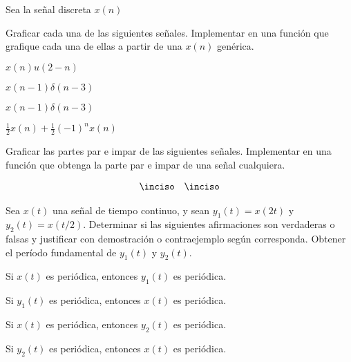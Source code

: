 \begin{ejercicio}
Sea la señal discreta $x(n)$
\begin{center}
    
\end{center}

Graficar cada una de las siguientes señales. Implementar en \Keyboardsym una función que grafique cada una de ellas a partir de una $x(n)$ genérica.

\inciso $x(n) u(2-n)$

\inciso $x(n-1) \delta(n-3)$

\inciso $x(n-1) \delta(n-3)$

\inciso $\frac{1}{2}x(n) + \frac{1}{2}(-1)^n x(n)$

\end{ejercicio}

\begin{ejercicio}
Graficar las partes par e impar de las siguientes señales. Implementar en \Keyboardsym una función que obtenga la parte par e impar de una señal cualquiera. 

\begin{align*}
\inciso \parbox{.3\textwidth}{} & \hfill & \inciso \parbox{.3\textwidth}{}
\end{align*}
\end{ejercicio}

\begin{ejercicio}
Sea $x(t)$ una señal de tiempo continuo, y sean $y_1(t) = x(2 t)$ y $y_2(t) = x(t / 2)$. Determinar si las siguientes afirmaciones son verdaderas o falsas y justificar con demostración o contraejemplo según corresponda. Obtener el período fundamental de $y_1(t)$ y $y_2(t)$.

\inciso Si $x(t)$ es periódica, entonces $y_1(t)$ es periódica.

\inciso Si $y_1(t)$ es periódica, entonces $x(t)$ es periódica.

\inciso Si $x(t)$ es periódica, entonces $y_2(t)$ es periódica.

\inciso Si $y_2(t)$ es periódica, entonces $x(t)$ es periódica.

\end{ejercicio}

